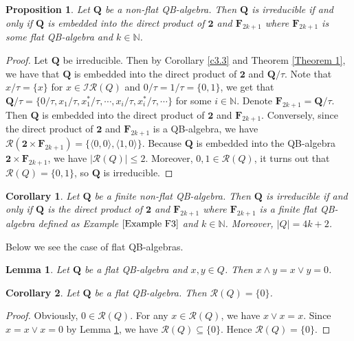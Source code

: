 \documentclass[12pt]{amsart}
\newtheorem{corollary}{Corollary}[section]
\newtheorem{lemma}{Lemma}[section]
\newtheorem{proposition}{Proposition}[section]
\theoremstyle{definition}
\theoremstyle{remark}
\numberwithin{equation}{section}
\begin{document}
\begin{proposition}
Let $\mathbf{Q}$ be a non-flat QB-algebra. Then $\mathbf{Q}$ is irreducible if and only if $\mathbf{Q}$ is embedded into the direct product of $\mathbf{2}$ and $\mathbf{F}_{2k+1}$
where $\mathbf{F}_{2k+1}$ is some flat QB-algebra and $k\in \mathbb{N}$.
\end{proposition}


\begin{proof}
Let $\mathbf{Q}$ be irreducible. Then by Corollary \ref{c3.3} and Theorem \ref{Theorem 1}, we have that $\mathbf{Q}$ is embedded into the direct product of $\mathbf{2}$ and $\mathbf{Q}/\tau$.
Note that $x/\tau=\{x\}$ for $x\in \mathscr{IR}(Q)$ and $0/\tau=1/\tau=\{0,1\}$, we get that $\mathbf{Q}/\tau=\{0/\tau, x_{1}/\tau, x^{\ast}_{1}/\tau,\cdots,x_{i}/\tau, x^{\ast}_{i}/\tau,\cdots\}$ for some $i\in \mathbb{N}$. Denote $\mathbf{F}_{2k+1}=\mathbf{Q}/\tau$. Then $\mathbf{Q}$ is embedded into the direct product of $\mathbf{2}$ and $\mathbf{F}_{2k+1}$.
Conversely, since the direct product of $\mathbf{2}$ and $\mathbf{F}_{2k+1}$ is a QB-algebra, we have $\mathscr{R}(\mathbf{2}\times \mathbf{F}_{2k+1})=\{\langle 0,0\rangle,\langle 1,0\rangle\}$. Because $\mathbf{Q}$ is embedded into the QB-algebra $\mathbf{2}\times \mathbf{F}_{2k+1}$, we have $|\mathscr{R}(Q)|\leq 2$. Moreover, $0, 1\in \mathscr{R}(Q)$, it turns out that $\mathscr{R}(Q)=\{0,1\}$, so $\mathbf{Q}$ is irreducible.
\end{proof}

\begin{corollary}
Let $\mathbf{Q}$ be a finite non-flat QB-algebra. Then $\mathbf{Q}$ is irreducible if and only if $\mathbf{Q}$ is the direct product of $\mathbf{2}$ and $\mathbf{F}_{2k+1}$
where $\mathbf{F}_{2k+1}$ is a finite flat QB-algebra defined as Example $\ref{Example F3}$ and $k\in \mathbb{N}$. Moreover, $|Q|=4k+2$.
\end{corollary}

Below we see the case of flat QB-algebras.

\begin{lemma}\label{Lemma 3}\label{vee 0}
Let $\mathbf{Q}$ be a flat QB-algebra and $x,y\in Q$. Then $x\wedge y=x\vee y=0$.
\end{lemma}

\begin{corollary}\label{Cor RQ}
Let $\mathbf{Q}$ be a flat QB-algebra. Then $\mathscr{R}(Q)=\{0\}$.
\end{corollary}

\begin{proof}
Obviously, $0\in \mathscr{R}(Q)$. For any $x\in \mathscr{R}(Q)$, we have $x\vee x=x$. Since $x=x\vee x=0$ by Lemma \ref{Lemma 3}, we have $\mathscr{R}(Q)\subseteq\{0\}$. Hence $\mathscr{R}(Q)=\{0\}$.
\end{proof}
\end{document}

